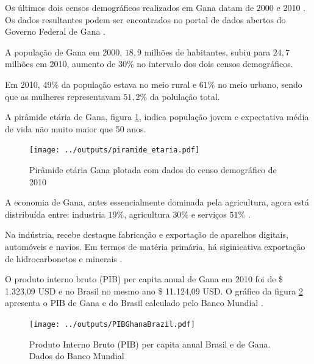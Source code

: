 Os últimos dois censos demográficos realizados em Gana datam
de 2000 \citep{ghanacensus2003} e 2010 \citep{ghanacensus2013}. Os
dados resultantes podem ser encontrados no portal de dados abertos
do Governo Federal de Gana \citep{opendataghana}.

A população de Gana em 2000, $18,9$ milhões de habitantes, subiu para $24,7$ 
milhões em 2010, aumento de $30\%$ no intervalo dos dois censos demográficos.

Em 2010, $49\%$ da população estava no meio rural e $61\%$ no meio urbano, sendo
que as mulheres representavam $51,2\%$ da polulação total.

A pirâmide etária de Gana, figura \ref{fig:piramedegana}, indica população 
jovem e expectativa média de vida não muito maior que 50 anos. 

\begin{figure}[H]
  \centering
  \texttt{[image: ../outputs/piramide\_etaria.pdf]}
  \caption{Pirâmide etária Gana plotada com dados do censo 
           demográfico de 2010 \citep{ghanacensus2013} \label{fig:piramedegana}}
\end{figure}

A economia de Gana, antes essencialmente dominada pela agricultura, 
agora está distribuída entre: industria $19\%$, agricultura $30\%$ 
e serviços $51\%$ \citep{ghanacensus2013}.

Na indústria, recebe destaque fabricação e exportação de aparelhos digitais, 
automóveis e navios. Em termos de matéria primária, há siginicativa 
exportação de hidrocarbonetos e minerais \citep{ghanacensus2013}.

O produto interno bruto (PIB) per capita anual de Gana em 2010 foi
de \$ 1.323,09 USD e no Brasil no mesmo ano \$ 11.124,09 USD.
O gráfico da figura \ref{fg:pib} apresenta o PIB de Gana e do Brasil 
calculado pelo Banco Mundial \citep{bancomundial}.

\begin{figure}[H]
\begin{center}
  \texttt{[image: ../outputs/PIBGhanaBrazil.pdf]}
  \caption{Produto Interno Bruto (PIB) per capita anual Brasil e de Gana. 
           Dados do Banco Mundial \citep{bancomundial} \label{fg:pib}}
\end{center}
\end{figure}


